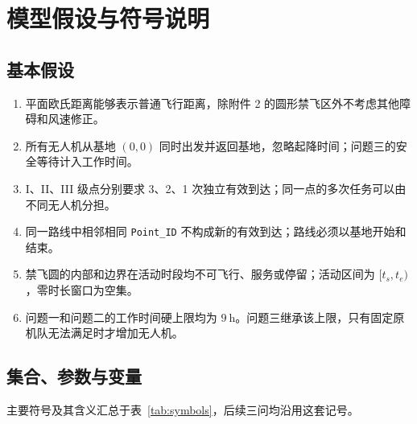 \section{模型假设与符号说明}

\subsection{基本假设}

\begin{enumerate}
\item 平面欧氏距离能够表示普通飞行距离，除附件 2 的圆形禁飞区外不考虑其他障碍和风速修正。
\item 所有无人机从基地 $(0,0)$ 同时出发并返回基地，忽略起降时间；问题三的安全等待计入工作时间。
\item I、II、III 级点分别要求 3、2、1 次独立有效到达；同一点的多次任务可以由不同无人机分担。
\item 同一路线中相邻相同 \texttt{Point\_ID} 不构成新的有效到达；路线必须以基地开始和结束。
\item 禁飞圆的内部和边界在活动时段均不可飞行、服务或停留；活动区间为 $[t_s,t_e)$，零时长窗口为空集。
\item 问题一和问题二的工作时间硬上限均为 $9\ \mathrm{h}$。问题三继承该上限，只有固定原机队无法满足时才增加无人机。
\end{enumerate}

\subsection{集合、参数与变量}

主要符号及其含义汇总于表~\ref{tab:symbols}，后续三问均沿用这套记号。

